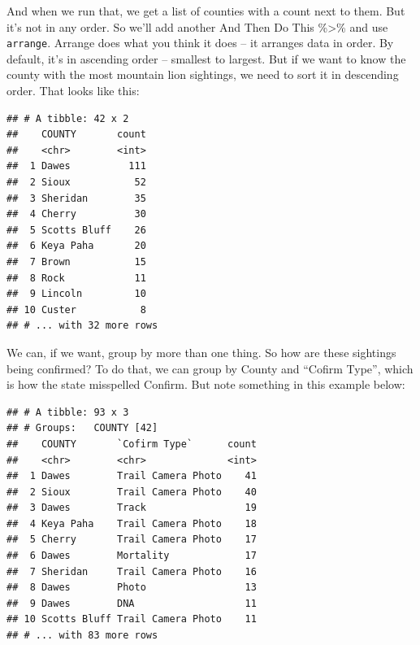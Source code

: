 \documentclass[]{book}
\newenvironment{Shaded}{\begin{snugshade}}{\end{snugshade}}
\newcommand{\KeywordTok}[1]{\textcolor[rgb]{0.13,0.29,0.53}{\textbf{#1}}}
\newcommand{\DataTypeTok}[1]{\textcolor[rgb]{0.13,0.29,0.53}{#1}}
\newcommand{\StringTok}[1]{\textcolor[rgb]{0.31,0.60,0.02}{#1}}
\newcommand{\OperatorTok}[1]{\textcolor[rgb]{0.81,0.36,0.00}{\textbf{#1}}}
\newcommand{\NormalTok}[1]{#1}
\begin{document}
And when we run that, we get a list of counties with a count next to
them. But it's not in any order. So we'll add another And Then Do This
\%\textgreater{}\% and use \texttt{arrange}. Arrange does what you think
it does -- it arranges data in order. By default, it's in ascending
order -- smallest to largest. But if we want to know the county with the
most mountain lion sightings, we need to sort it in descending order.
That looks like this:

\begin{Shaded}
\end{Shaded}

\begin{verbatim}
## # A tibble: 42 x 2
##    COUNTY       count
##    <chr>        <int>
##  1 Dawes          111
##  2 Sioux           52
##  3 Sheridan        35
##  4 Cherry          30
##  5 Scotts Bluff    26
##  6 Keya Paha       20
##  7 Brown           15
##  8 Rock            11
##  9 Lincoln         10
## 10 Custer           8
## # ... with 32 more rows
\end{verbatim}

We can, if we want, group by more than one thing. So how are these
sightings being confirmed? To do that, we can group by County and
``Cofirm Type'', which is how the state misspelled Confirm. But note
something in this example below:

\begin{Shaded}
\end{Shaded}

\begin{verbatim}
## # A tibble: 93 x 3
## # Groups:   COUNTY [42]
##    COUNTY       `Cofirm Type`      count
##    <chr>        <chr>              <int>
##  1 Dawes        Trail Camera Photo    41
##  2 Sioux        Trail Camera Photo    40
##  3 Dawes        Track                 19
##  4 Keya Paha    Trail Camera Photo    18
##  5 Cherry       Trail Camera Photo    17
##  6 Dawes        Mortality             17
##  7 Sheridan     Trail Camera Photo    16
##  8 Dawes        Photo                 13
##  9 Dawes        DNA                   11
## 10 Scotts Bluff Trail Camera Photo    11
## # ... with 83 more rows
\end{verbatim}
\end{document}
